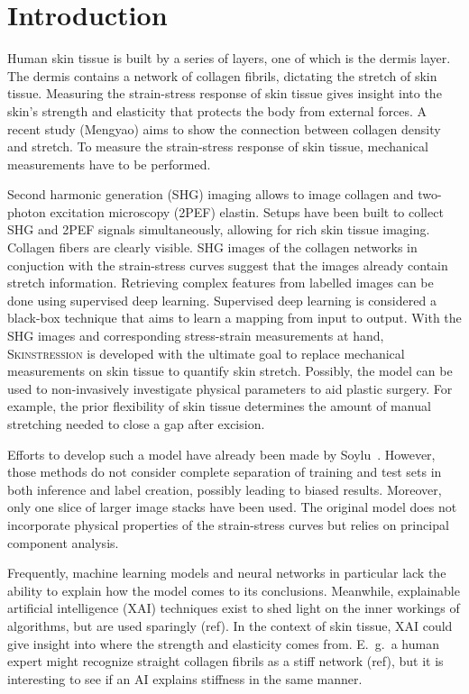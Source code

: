 \section{Introduction}

Human skin tissue is built by a series of layers, one of which is the dermis layer.
The dermis contains a network of collagen fibrils, dictating the stretch of skin tissue.
Measuring the strain-stress response of skin tissue gives insight into the skin's strength and elasticity that protects the body from external forces.
A recent study (Mengyao) aims to show the connection between collagen density and stretch.
To measure the strain-stress response of skin tissue, mechanical measurements have to be performed.

Second harmonic generation (SHG) imaging allows to image collagen and two-photon excitation microscopy (2PEF) elastin.
Setups have been built to collect SHG and 2PEF signals simultaneously, allowing for rich skin tissue imaging.
Collagen fibers are clearly visible.
SHG images of the collagen networks in conjuction with the strain-stress curves suggest that the images already contain stretch information.
Retrieving complex features from labelled images can be done using supervised deep learning.
Supervised deep learning is considered a black-box technique that aims to learn a mapping from input to output.
With the SHG images and corresponding stress-strain measurements at hand, \textsc{Skinstression} is developed with the ultimate goal to replace mechanical measurements on skin tissue to quantify skin stretch.
Possibly, the model can be used to non-invasively investigate physical parameters to aid plastic surgery.
For example, the prior flexibility of skin tissue determines the amount of manual stretching needed to close a gap after excision.

Efforts to develop such a model have already been made by Soylu~\cite{Soylu2022}.
However, those methods do not consider complete separation of training and test sets in both inference and label creation, possibly leading to biased results.
Moreover, only one slice of larger image stacks have been used.
The original model does not incorporate physical properties of the strain-stress curves but relies on principal component analysis.

Frequently, machine learning models and neural networks in particular lack the ability to explain how the model comes to its conclusions.
Meanwhile, explainable artificial intelligence (XAI) techniques exist to shed light on the inner workings of algorithms, but are used sparingly (ref).
In the context of skin tissue, XAI could give insight into where the strength and elasticity comes from.
E.\ g.\ a human expert might recognize straight collagen fibrils as a stiff network (ref), but it is interesting to see if an AI explains stiffness in the same manner.


